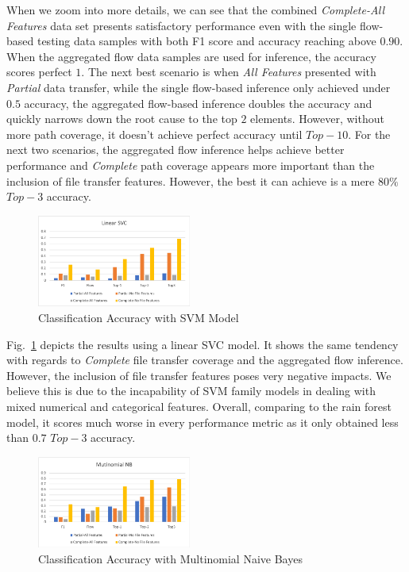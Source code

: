 When we zoom into more details, we can see that the combined {\it Complete-All Features} data set presents satisfactory performance even with the single flow-based testing data samples with 
both F1 score and accuracy reaching above $0.90$. When the aggregated flow data samples are used for inference, the accuracy scores perfect $1$. The next best scenario is when {\it All Features} presented with 
{\it Partial} data transfer, while the single flow-based inference only achieved under $0.5$ accuracy, the aggregated flow-based inference doubles the accuracy and quickly narrows down the root cause to the 
top $2$ elements. However, without more path coverage, it doesn't achieve perfect accuracy until $Top-10$. For the next two scenarios, the aggregated flow inference helps achieve better performance 
and {\it Complete} path coverage appears more important than the inclusion of file transfer features. However, the best it can achieve is a mere $80\%$ $Top-3$ accuracy.  

\begin{figure}[!ht]
\begin{center}
\includegraphics[width=0.45\textwidth]{./figure/svc-accuracy}
\end{center}
\caption{Classification Accuracy with SVM Model}
\label{fig:svm}
\end{figure}

Fig.~\ref{fig:svm} depicts the results using a linear SVC model. It shows the same tendency with regards to {\it Complete} file transfer coverage and the aggregated flow inference. 
However, the inclusion of file transfer features poses very negative impacts. We believe this is due to the incapability of SVM family models in dealing with mixed numerical and categorical features. 
Overall, comparing to the rain forest model, it scores much worse in every performance metric as it only obtained less than $0.7$ $Top-3$ accuracy.

\begin{figure}[!ht]
\begin{center}
\includegraphics[width=0.45\textwidth]{./figure/nb-accuracy}
\end{center}
\caption{Classification Accuracy with Multinomial Naive Bayes}
\label{fig:bn}
\end{figure}


